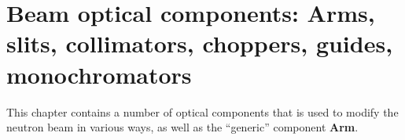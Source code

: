 
\chapter{Beam optical components:
Arms, slits, collimators, choppers, guides, monochromators}
This chapter contains a number of optical components
that is used to modify the neutron beam in various ways,
as well as the ``generic'' component {\bf Arm}.



\newpage


\newpage


\newpage


\newpage


\newpage


\newpage


\newpage


%

\newpage


\newpage

